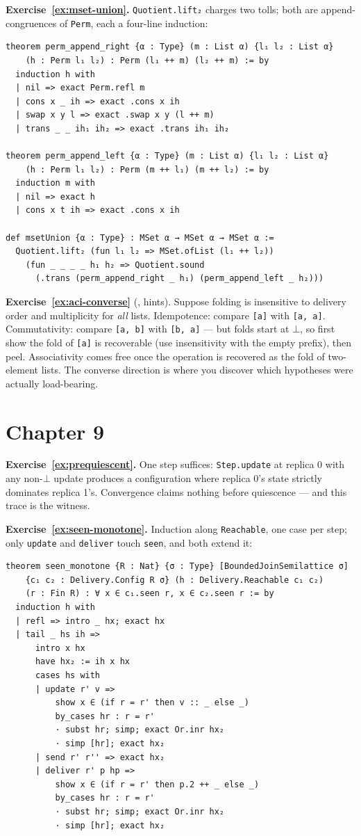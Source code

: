 \documentclass[12pt, a4paper, openright]{book}
\theoremstyle{thmstyle}
\theoremstyle{defstyle}
\newcommand{\lc}[1]{\texttt{#1}}
\begin{document}
\textbf{Exercise~\ref{ex:mset-union}.} \lc{Quotient.lift₂} charges two
tolls; both are append-congruences of \lc{Perm}, each a four-line
induction:

\begin{verbatim}
theorem perm_append_right {α : Type} (m : List α) {l₁ l₂ : List α}
    (h : Perm l₁ l₂) : Perm (l₁ ++ m) (l₂ ++ m) := by
  induction h with
  | nil => exact Perm.refl m
  | cons x _ ih => exact .cons x ih
  | swap x y l => exact .swap x y (l ++ m)
  | trans _ _ ih₁ ih₂ => exact .trans ih₁ ih₂

theorem perm_append_left {α : Type} (m : List α) {l₁ l₂ : List α}
    (h : Perm l₁ l₂) : Perm (m ++ l₁) (m ++ l₂) := by
  induction m with
  | nil => exact h
  | cons x t ih => exact .cons x ih

def msetUnion {α : Type} : MSet α → MSet α → MSet α :=
  Quotient.lift₂ (fun l₁ l₂ => MSet.ofList (l₁ ++ l₂))
    (fun _ _ _ _ h₁ h₂ => Quotient.sound
      (.trans (perm_append_right _ h₁) (perm_append_left _ h₂)))
\end{verbatim}

\textbf{Exercise~\ref{ex:aci-converse}} (,
hints). Suppose folding is insensitive to delivery order and
multiplicity for \emph{all} lists. Idempotence: compare \lc{[a]} with
\lc{[a, a]}. Commutativity: compare \lc{[a, b]} with \lc{[b, a]} ---
but folds start at $\bot$, so first show the fold of \lc{[a]} is
recoverable (use insensitivity with the empty prefix), then peel.
Associativity comes free once the operation is recovered as the fold of
two-element lists. The converse direction is where you discover which
hypotheses were actually load-bearing.

\section*{Chapter 9}

\textbf{Exercise~\ref{ex:prequiescent}.} One step suffices:
\lc{Step.update} at replica 0 with any non-$\bot$ update produces a
configuration where replica 0's state strictly dominates replica 1's.
Convergence claims nothing before quiescence --- and this trace is the
witness.

\textbf{Exercise~\ref{ex:seen-monotone}.} Induction along
\lc{Reachable}, one case per step; only \lc{update} and \lc{deliver}
touch \lc{seen}, and both extend it:

\begin{verbatim}
theorem seen_monotone {R : Nat} {σ : Type} [BoundedJoinSemilattice σ]
    {c₁ c₂ : Delivery.Config R σ} (h : Delivery.Reachable c₁ c₂)
    (r : Fin R) : ∀ x ∈ c₁.seen r, x ∈ c₂.seen r := by
  induction h with
  | refl => intro _ hx; exact hx
  | tail _ hs ih =>
      intro x hx
      have hx₂ := ih x hx
      cases hs with
      | update r' v =>
          show x ∈ (if r = r' then v :: _ else _)
          by_cases hr : r = r'
          · subst hr; simp; exact Or.inr hx₂
          · simp [hr]; exact hx₂
      | send r' r'' => exact hx₂
      | deliver r' p hp =>
          show x ∈ (if r = r' then p.2 ++ _ else _)
          by_cases hr : r = r'
          · subst hr; simp; exact Or.inr hx₂
          · simp [hr]; exact hx₂
\end{verbatim}
\end{document}
